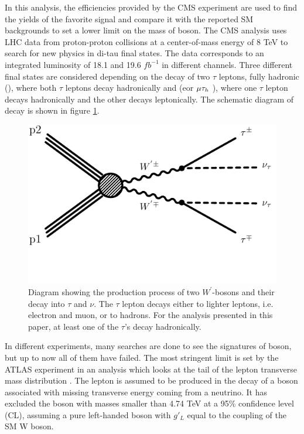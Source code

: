 In this analysis, the efficiencies provided by the CMS experiment \cite{Khachatryan:2016trj} are used to find the yields of the favorite signal and compare it with the reported SM backgrounds to set a lower limit on the mass of \wprime boson. 
The CMS analysis uses LHC data from proton-proton collisions at a center-of-mass energy of 8 TeV to search for new physics in di-tau final states.  The data corresponds to an integrated luminosity of 18.1 and 19.6 $fb^{-1}$ in different channels. Three different final states are considered depending on the decay of two $\tau$ leptons, fully hadronic (\tauTau), where both $\tau$ leptons decay hadronically and \lepTau (e\Tau or $\mu\tau_h~$), where one $\tau$ lepton decays hadronically and the other decays leptonically. The schematic diagram of decay is shown in figure \ref{fig:wprimefeyndiagram}.
\begin{figure}[!htb]
  \includegraphics*[width=.45\textwidth]{figs/WpWpTauTau.pdf}
  \caption{Diagram showing the production process of two $W^{'}$-bosons and their decay into $\tau$ and $\nu$. The $\tau$ lepton decays either to lighter leptons, i.e. electron and muon, or to hadrons. For the analysis presented in this paper, at least one of the $\tau$'s decay hadronically.}
  \label{fig:wprimefeyndiagram}
\end{figure}

In different experiments, many searches are done to see the signatures of \wprime boson, but up to now all of them have failed. The most stringent limit is set by the ATLAS experiment in an analysis which looks at the tail of the lepton transverse mass distribution \cite{ATLAS:2016ecs}. The lepton is assumed to be produced in the decay of a \wprime boson associated with missing transverse energy coming from a neutrino. It has excluded the \wprime boson with masses smaller than 4.74 TeV at a 95\% confidence level (CL), assuming a pure left-handed \wprime boson with $g'_L$ equal to the coupling of the SM W boson. 